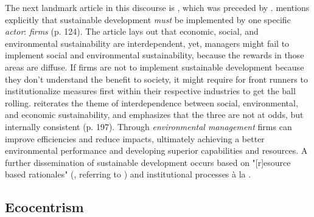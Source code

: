 \documentclass{article}
\begin{document}
{	The next landmark article in this discourse is \citet{Bansal2005}, which was preceded by \citet{Bansal2002}. 
	\citet{Bansal2002} mentions explicitly that sustainable development \textit{must} be implemented by one specific \textit{actor}: \textit{firms} (p. 124). 
	The article lays out that economic, social, and environmental sustainability are interdependent, yet, managers might fail to implement social and environmental sustainability, because the rewards in those areas are diffuse. If firms are not to implement sustainable development because they don't understand the benefit to society, it might require for front runners to institutionalize measures first within their respective industries to get the ball rolling.
	\citet{Bansal2005} reiterates the theme of interdependence between social, environmental, and economic sustainability, and emphasizes that the three are not at odds, but internally consistent (p. 197). Through \textit{environmental management} firms can improve efficiencies and reduce impacts, ultimately achieving a better environmental performance and developing superior capabilities and resources. A further dissemination of sustainable development occurs based on "[r]esource based rationales" (\citealp[p. 200]{Bansal2005}, referring to \citealp{Barney1991a}) and institutional processes à la \citet{Meyer1977}.


	\subsection*{Ecocentrism}


}
\end{document}
